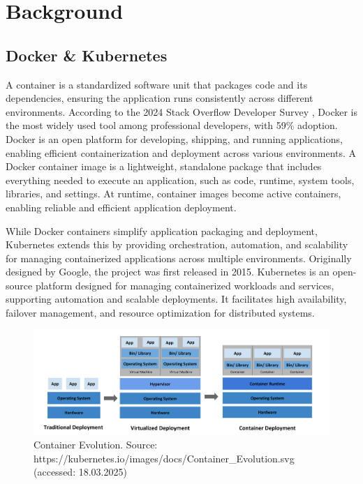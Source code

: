 \documentclass[../main.tex]{subfiles}
\begin{document}
\chapter{Background}

\section{Docker \& Kubernetes} 

A container is a standardized software unit that packages code and its dependencies, ensuring the application runs consistently across different environments. According to the 2024 Stack Overflow Developer Survey \cite{surveystackoverflow}, Docker is the most widely used tool among professional developers, with 59\% adoption. Docker is an open platform for developing, shipping, and running applications, enabling efficient containerization and deployment across various environments. A Docker container image is a lightweight, standalone package that includes everything needed to execute an application, such as code, runtime, system tools, libraries, and settings. At runtime, container images become active containers, enabling reliable and efficient application deployment. \cite{container}

While Docker containers simplify application packaging and deployment, Kubernetes extends this by providing orchestration, automation, and scalability for managing containerized applications across multiple environments. Originally designed by Google, the project was first released in 2015. Kubernetes is an open-source platform designed for managing containerized workloads and services, supporting automation and scalable deployments. It facilitates high availability, failover management, and resource optimization for distributed systems. 

\begin{figure}[h]
    \centering
    \includegraphics[scale=0.5]{img/2-background/kubernetes/container_evolution.png}
    \caption{Container Evolution. Source: https://kubernetes.io/images/docs/Container\_Evolution.svg (accessed: 18.03.2025)}
    \label{fig:container_evolution}
\end{figure}
\end{document}
